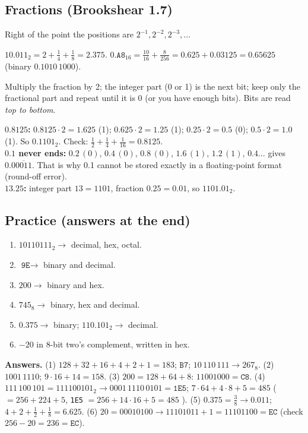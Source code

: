 \documentclass{fkt-notes}
\newcommand{\bsub}[2]{#1_{#2}}  %
\begin{document}
\subsection{Fractions (Brookshear 1.7)}
\begin{rulebox}[title={Binary $\to$ decimal: place values $\tfrac12,\tfrac14,\tfrac18,\dots$}]
  Right of the point the positions are $2^{-1},2^{-2},2^{-3},\dots$
\end{rulebox}
$\bsub{10.011}{2}=2+\tfrac14+\tfrac18=2.375$. \quad
$\bsub{0.\texttt{A8}}{16}=\tfrac{10}{16}+\tfrac{8}{256}=0.625+0.03125=0.65625$ (binary $0.1010\,1000$).
\begin{rulebox}[title={Decimal fraction $\to$ binary: repeated multiplication}]
  Multiply the fraction by 2; the integer part (0 or 1) is the next bit; keep only the fractional part and repeat
  until it is 0 (or you have enough bits). Bits are read \emph{top to bottom}.
\end{rulebox}
\noindent\textbf{$0.8125$:} $0.8125\cdot2=1.625$ (1); $0.625\cdot2=1.25$ (1); $0.25\cdot2=0.5$ (0); $0.5\cdot2=1.0$ (1). So $\bsub{0.1101}{2}$.
Check: $\tfrac12+\tfrac14+\tfrac1{16}=0.8125$. \checkmark\\
\textbf{$0.1$ never ends:} $0.2\,(0)$, $0.4\,(0)$, $0.8\,(0)$, $1.6\,(1)$, $1.2\,(1)$, $0.4\dots$ gives $0.0\overline{0011}$.
That is why 0.1 cannot be stored exactly in a floating-point format (round-off error).\\
\textbf{$13.25$:} integer part $13=1101$, fraction $0.25=0.01$, so $\bsub{1101.01}{2}$.

\subsection{Practice (answers at the end)}
\begin{enumerate}
  \item $\bsub{10110111}{2}\to$ decimal, hex, octal.
  \item $\texttt{9E}\to$ binary and decimal.
  \item $200\to$ binary and hex.
  \item $\bsub{745}{8}\to$ binary, hex and decimal.
  \item $0.375\to$ binary; $\bsub{110.101}{2}\to$ decimal.
  \item $-20$ in 8-bit two's complement, written in hex.
\end{enumerate}
\textbf{Answers.}
(1) $128+32+16+4+2+1=183$; $\texttt{B7}$; $10\,110\,111\to 267_8$.
(2) $1001\,1110$; $9\cdot16+14=158$.
(3) $200=128+64+8$: $11001000=\texttt{C8}$.
(4) $111\,100\,101=\bsub{111100101}{2}\to 0001\,1110\,0101=\texttt{1E5}$; $7\cdot64+4\cdot8+5=485$ ($=256+224+5$, \texttt{1E5} $=256+14\cdot16+5=485$ \checkmark).
(5) $0.375=\tfrac38\to0.011$; $4+2+\tfrac12+\tfrac18=6.625$.
(6) $20=00010100\to11101011+1=11101100=\texttt{EC}$ (check $256-20=236=\texttt{EC}$).
\end{document}
